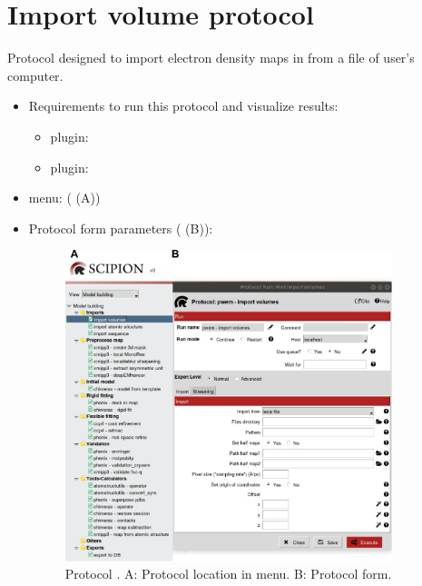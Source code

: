 \section{Import volume protocol}
\label{app:importVolume}%
Protocol designed to import electron density maps in \scipion from a file of user's computer.
   
 \begin{itemize}
  \item Requirements to run this protocol and visualize results:
    \begin{itemize}
        \item \scipion plugin: 
        \item \scipion plugin: 
    \end{itemize}
  \item \scipion menu:
   ( (A))
  
  \item Protocol form parameters ( (B)):
  
  \begin{figure}[H]
    \centering 
    \captionsetup{width=.7\linewidth} 
    \includegraphics[width=0.90\textwidth]{Images_appendix/Fig100.pdf}
    \caption{Protocol . A: Protocol location in \scipion menu. B: Protocol form.}
    \label{fig:app_protocol_volume_1}
   \end{figure}
  


\end{itemize}
